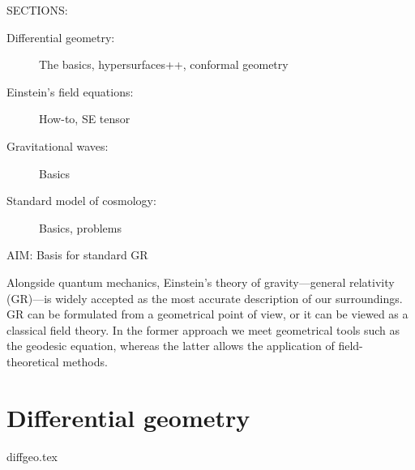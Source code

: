 







\begin{bullets}
    \item SECTIONS: %
        \begin{description}
            \item[Differential geometry:] The basics, hypersurfaces++, conformal geometry 
            \item[Einstein's field equations:] How-to, SE tensor 
            \item[Gravitational waves:] Basics
            \item[Standard model of cosmology:] Basics, problems 
        \end{description}
    \item AIM: Basis for standard GR 
\end{bullets}






Alongside quantum mechanics, Einstein's theory of gravity---general relativity (GR)---is widely accepted as the most accurate description of our surroundings. GR can be formulated from a geometrical point of view, or it can be viewed as a classical field theory. In the former approach we meet geometrical tools such as the geodesic equation, whereas the latter allows the application of field-theoretical methods. 











\section{Differential geometry}\label{sec:GR:diffgeo}
{{diffgeo.tex}}


